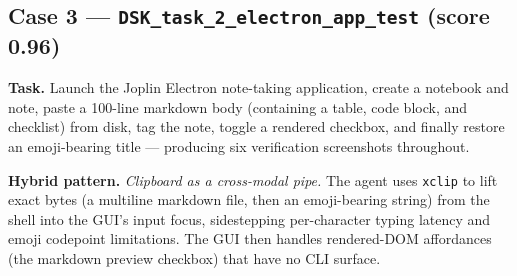 \subsection{Case 3 --- \texttt{DSK\_task\_2\_electron\_app\_test} (score 0.96)}
\label{app:case-electron}

\textbf{Task.} Launch the Joplin Electron note-taking application, create a notebook and note, paste a 100-line markdown body (containing a table, code block, and checklist) from disk, tag the note, toggle a rendered checkbox, and finally restore an emoji-bearing title --- producing six verification screenshots throughout.

\textbf{Hybrid pattern.} \emph{Clipboard as a cross-modal pipe.} The agent uses \texttt{xclip} to lift exact bytes (a multiline markdown file, then an emoji-bearing string) from the shell into the GUI's input focus, sidestepping per-character typing latency and emoji codepoint limitations. The GUI then handles rendered-DOM affordances (the markdown preview checkbox) that have no CLI surface.

